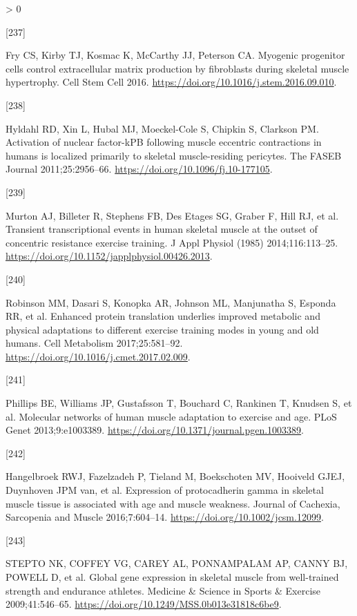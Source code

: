 \documentclass[twoside,10pt]{gihclass} %
\newlength{\cslhangindent}
\newlength{\csllabelwidth}
\newenvironment{CSLReferences}[3] %
 {%
  \setlength{\parindent}{0pt}
  \ifodd #1 \everypar{\setlength{\hangindent}{\cslhangindent}}\ignorespaces\fi
  \ifnum #2 > 0
  \setlength{\parskip}{#2\baselineskip}
  \fi
 }%
 {}
\newcommand{\CSLLeftMargin}[1]{\parbox[t]{\maxof{\widthof{#1}}{\csllabelwidth}}{#1}}
\newcommand{\CSLRightInline}[1]{\parbox[t]{\linewidth}{#1}}
\begin{document}
\begin{CSLReferences}{0}{0}
\leavevmode\hypertarget{ref-RN1888}{}%
\CSLLeftMargin{{[}237{]} }
\CSLRightInline{Fry CS, Kirby TJ, Kosmac K, McCarthy JJ, Peterson CA. Myogenic progenitor cells control extracellular matrix production by fibroblasts during skeletal muscle hypertrophy. Cell Stem Cell 2016. \url{https://doi.org/10.1016/j.stem.2016.09.010}.}

\leavevmode\hypertarget{ref-RN2408}{}%
\CSLLeftMargin{{[}238{]} }
\CSLRightInline{Hyldahl RD, Xin L, Hubal MJ, Moeckel-Cole S, Chipkin S, Clarkson PM. Activation of nuclear factor-kPB following muscle eccentric contractions in humans is localized primarily to skeletal muscle-residing pericytes. The FASEB Journal 2011;25:2956--66. \url{https://doi.org/10.1096/fj.10-177105}.}

\leavevmode\hypertarget{ref-RN2299}{}%
\CSLLeftMargin{{[}239{]} }
\CSLRightInline{Murton AJ, Billeter R, Stephens FB, Des Etages SG, Graber F, Hill RJ, et al. Transient transcriptional events in human skeletal muscle at the outset of concentric resistance exercise training. J Appl Physiol (1985) 2014;116:113--25. \url{https://doi.org/10.1152/japplphysiol.00426.2013}.}

\leavevmode\hypertarget{ref-RN2400}{}%
\CSLLeftMargin{{[}240{]} }
\CSLRightInline{Robinson MM, Dasari S, Konopka AR, Johnson ML, Manjunatha S, Esponda RR, et al. Enhanced protein translation underlies improved metabolic and physical adaptations to different exercise training modes in young and old humans. Cell Metabolism 2017;25:581--92. \url{https://doi.org/10.1016/j.cmet.2017.02.009}.}

\leavevmode\hypertarget{ref-RN753}{}%
\CSLLeftMargin{{[}241{]} }
\CSLRightInline{Phillips BE, Williams JP, Gustafsson T, Bouchard C, Rankinen T, Knudsen S, et al. Molecular networks of human muscle adaptation to exercise and age. PLoS Genet 2013;9:e1003389. \url{https://doi.org/10.1371/journal.pgen.1003389}.}

\leavevmode\hypertarget{ref-RN2402}{}%
\CSLLeftMargin{{[}242{]} }
\CSLRightInline{Hangelbroek RWJ, Fazelzadeh P, Tieland M, Boekschoten MV, Hooiveld GJEJ, Duynhoven JPM van, et al. Expression of protocadherin gamma in skeletal muscle tissue is associated with age and muscle weakness. Journal of Cachexia, Sarcopenia and Muscle 2016;7:604--14. \url{https://doi.org/10.1002/jcsm.12099}.}

\leavevmode\hypertarget{ref-RN2398}{}%
\CSLLeftMargin{{[}243{]} }
\CSLRightInline{STEPTO NK, COFFEY VG, CAREY AL, PONNAMPALAM AP, CANNY BJ, POWELL D, et al. Global gene expression in skeletal muscle from well-trained strength and endurance athletes. Medicine \& Science in Sports \& Exercise 2009;41:546--65. \url{https://doi.org/10.1249/MSS.0b013e31818c6be9}.}


\end{CSLReferences}
\end{document}
